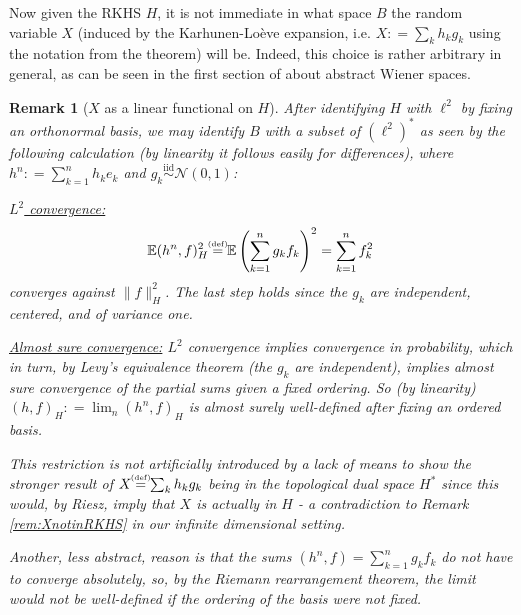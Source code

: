 \documentclass[11pt,reqno]{amsart}
\numberwithin{equation}{section}
\newtheorem{rem}[thm]{Remark}
\newcommand{\eqbydef}{\mathrel{\stackrel{\hspace*{-3mm}\text{\tiny(def)}\hspace*{-3mm}}{=}}}
\newcommand{\deq}{\mathrel{\mathop:}=}
\newcommand{\iidnormal}{\mathrel{\stackrel{\text{iid}}{\sim}}\mathcal N(0,1)}
\begin{document}
Now given the RKHS $H$, it is not immediate in what space $B$ the random variable $X$ (induced by the Karhunen-Lo\`eve expansion, i.e. $X\deq \sum_k h_kg_k$ using the notation from the theorem) will be. Indeed, this choice is rather arbitrary in general, as can be seen in the first section of \cite{She07} about abstract Wiener spaces.

\begin{rem}[$X$ as a linear functional on $H$]\label{rem:XlikeinKL}
	After identifying $H$ with $\ell^2$ by fixing an orthonormal basis, we may identify $B$ with a subset of $(\ell^2)^*$ as seen by the following calculation (by linearity it follows easily for differences), where $h^n\deq \sum_{k=1}^n h_ke_k$ and $g_k\iidnormal$:
	
	\underline{$L^2$ convergence:}
	\begin{equation}\label{eq:varianceofHasRandomDistribution}
		\mathbb E(h^n,f)_H^2 \eqbydef \mathbb E\left(\sum_{k=1}^n g_k f_k\right)^2 = \sum_{k=1}^n f_k^2
	\end{equation} converges against $\|f\|_H^2$. The last step holds since the $g_k$ are independent, centered, and of variance one.
	
	\underline{Almost sure convergence:} $L^2$ convergence implies convergence in probability, which in turn, by Levy's equivalence theorem (the $g_k$ are independent), implies almost sure convergence of the \emph{partial sums} given a fixed ordering.
		So (by linearity) $(h,f)_H\deq\lim_n(h^n,f)_H$ is almost surely well-defined after fixing an ordered basis.
	
	This restriction is not artificially introduced by a lack of means to show the stronger result of $X\eqbydef \sum_k h_kg_k$ being in the topological dual space $H^*$ since this would, by Riesz, imply that $X$ is actually in $H$ - a contradiction to Remark \ref{rem:XnotinRKHS} in our infinite dimensional setting.
	
	Another, less abstract, reason is that the sums $(h^n,f)=\sum_{k=1}^ng_kf_k$ do not have to converge absolutely, so, by the Riemann rearrangement theorem, the limit would not be well-defined if the ordering of the basis were not fixed.
\end{rem}
\end{document}
